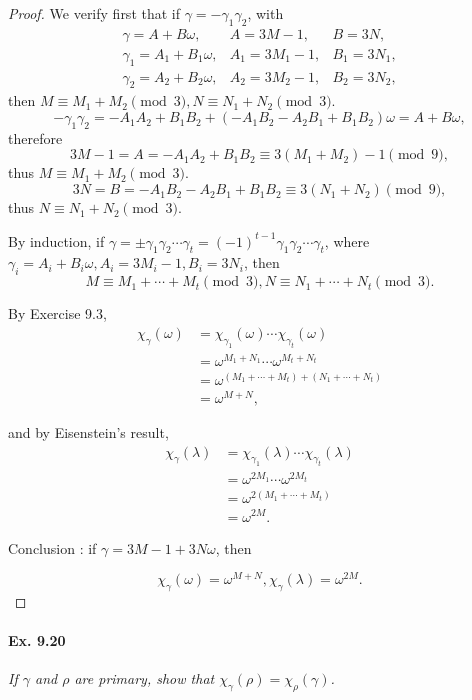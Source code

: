 \documentclass[11pt,a4paper]{article}
\begin{document}
\begin{proof}
We verify first that if $\gamma = -\gamma_1 \gamma_2$, with
$$
\begin{array}{lll}
  \gamma = A+B\omega, & A=3M-1,  & B=3N,  \\
   \gamma_1 = A_1+B_1\omega,& A_1= 3M_1-1,  &  B_1=3N_1, \\
  \gamma_2 = A_2+B_2\omega,&  A_2= 3M_2-1, &  B_2=3N_2, 
\end{array}
$$
then $M \equiv M_1+M_2\pmod 3,N \equiv N_1+N_2 \pmod 3$.
$$-\gamma_1 \gamma_2 = -A_1A_2 + B_1 B_2  + (- A_1B_2-A_2B_1+B_1B_2) \omega=A+B\omega,$$
therefore
$$3M-1 = A =-A_1A_2 + B_1 B_2 \equiv 3(M_1+M_2) - 1\pmod 9,$$
thus $M\equiv M_1+M_2\pmod 3.$
$$3N = B = -A_1B_2-A_2B_1+B_1B_2 \equiv 3 (N_1+N_2)\pmod 9,$$ 
thus $N \equiv N_1+N_2 \pmod 3.$

By induction, if $\gamma = \pm \gamma_1 \gamma_2\cdots \gamma_t = (-1)^{t-1} \gamma_1 \gamma_2\cdots \gamma_t$, where $\gamma_i = A_i+B_i\omega,A_i= 3M_i-1,B_i=3N_i$, then
$$M \equiv M_1+\cdots+M_t\pmod 3, N \equiv N_1+\cdots + N_t \pmod 3.$$

By Exercise 9.3,
\begin{align*}
\chi_\gamma(\omega) &= \chi_{\gamma_1}(\omega)\cdots\chi_{\gamma_t}(\omega)\\
&=\omega^{M_1+N_1}\cdots \omega^{M_t+N_t}\\
&=\omega^{(M_1+\cdots+M_t)+(N_1+\cdots+N_t)}\\
&=\omega^{M+N},
\end{align*}

and by Eisenstein's result,
\begin{align*}
\chi_\gamma(\lambda) &= \chi_{\gamma_1}(\lambda)\cdots\chi_{\gamma_t}(\lambda)\\
&=\omega^{2M_1}\cdots \omega^{2M_t}\\
&=\omega^{2(M_1+\cdots+M_t)}\\
&=\omega^{2M}.
\end{align*}

Conclusion : if $\gamma = 3M-1+3N\omega$, then

$$\chi_\gamma(\omega) = \omega^{M+N}, \chi_\gamma(\lambda)=\omega^{2M}.$$
\end{proof}

\paragraph{Ex. 9.20}

{\it If $\gamma$ and $\rho$ are primary, show that $\chi_\gamma(\rho) = \chi_\rho(\gamma)$.
}
\end{document}
